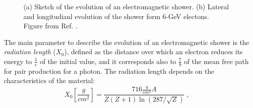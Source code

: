 \begin{figure}[ht]
\centering
{}
\caption{(a) Sketch of the evolution of an electromagnetic shower. (b) Lateral and longitudianl evolution of the shower form 6-GeV electons. Figure from Ref. \cite{grupen_shwartz_2008}.}
\label{fig:det:shower_elec}
\end{figure}


The main parameter to describe the evolution of an electromagnetic shower is the \textit{radiation length} ($X_0$), defined as the distance over which an electron reduces its energy to $\frac{1}{e}$ of the initial value, and it corresponds also to $\frac{7}{9}$ of the mean free path for pair production for a photon. The radiation length depends on the characteristics of the material:
\begin{equation}
X_0 [\frac{g}{cm^2}] = \frac{716 \frac{g}{ cm^2} A }{Z(Z+1) \ln\left(287/\sqrt{Z}\right)} \; ,
\end{equation}

